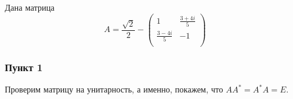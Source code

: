 
Дана матрица
\begin{equation*}
	A = \frac{\sqrt{2}}{2} -\begin{pmatrix}
	    1 & \frac{3 + 4 i}{5} \\
	    \frac{3 - 4 i}{5} & -1 \\
	\end{pmatrix}
\end{equation*}
\subsubsection*{Пункт 1}
Проверим матрицу на унитарность, а именно, покажем, что $A A^* = A^* A = E$.